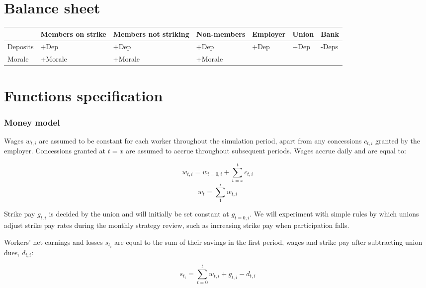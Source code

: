 \documentclass[a4paper]{article}
\begin{document}
\section{Balance sheet}
\begin{tabular}{| l | l | l | l | l | l | l |}
\hline
  & \textbf{Members on strike} & \textbf{Members not striking} & \textbf{Non-members} & \textbf{Employer} & \textbf{Union} & \textbf{Bank} \\
\hline
Deposits & +Dep & +Dep & +Dep & +Dep & +Dep & -Deps \\
\hline
Morale & +Morale & +Morale & +Morale &   &   &   \\
\hline
\end{tabular}

\section{Functions specification}

\subsubsection{Money model}

Wages $w_{t,i}$ are assumed to be constant for each worker throughout the simulation period, apart from any concessions $c_{t,i}$ granted by the employer. Concessions granted at $t=x$ are assumed to accrue throughout subsequent periods. Wages accrue daily and are equal to:

\begin{equation}
    w_{t,i} = w_{t=0,i} +\sum_{t=x}^{t} c_{t,i}
\end{equation}
\begin{equation}
    w_{t} = \sum_{1}^{i} w_{t,i}
\end{equation}

Strike pay $g_{t,i}$ is decided by the union and will initially be set constant at $g_{t=0,i}$. We will experiment with simple rules by which unions adjust strike pay rates during the monthly strategy review, such as increasing strike pay when participation falls.

Workers' net earnings and losses $s_{t_i}$ are equal to the sum of their savings in the first period, wages and strike pay after subtracting union dues, $d_{t,i}$:

\begin{equation}
    s_{t_i} = \sum_{t=0}^{t} w_{t,i} + g_{t,i} - d_{t,i}
\end{equation}
\end{document}
